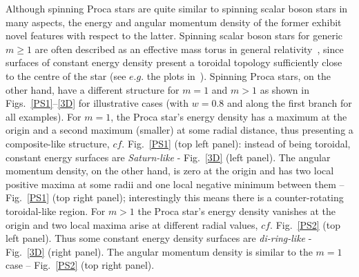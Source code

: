 Although spinning Proca stars are quite similar to spinning scalar boson stars in many aspects, the energy and angular momentum density of the former exhibit novel features with respect to the latter.
Spinning scalar boson stars for generic $m\geqslant 1$ are often described as an effective mass torus in general relativity~\cite{Schunck:1996he}, since surfaces of constant energy density present a toroidal topology sufficiently close to the centre of the star (see $e.g.$ the plots in~\cite{Herdeiro:2014ima}).
Spinning Proca stars, on the other hand, have a different structure for $m=1$ and $m>1$ as shown in Figs.~\ref{PS1}--\ref{3D} for illustrative cases (with $w=0.8$ and along the first branch for all examples).
For $m=1$, the Proca star's energy density has a maximum at the origin and a second maximum (smaller) at some radial distance, thus presenting a composite-like structure, $cf.$ Fig.~\ref{PS1} (top left panel): instead of being toroidal, constant energy surfaces are \textit{Saturn-like} - Fig.~\ref{3D} (left panel).
The angular momentum density, on the other hand, is zero at the origin and has two local positive maxima at some radii and one local negative minimum between them -- Fig.~\ref{PS1} (top right panel); interestingly this means there is a counter-rotating toroidal-like region.
For $m>1$ the Proca star's energy density vanishes at the origin and two local maxima arise at different radial values, $cf.$ Fig.~\ref{PS2} (top left panel).
Thus some constant energy density surfaces are \textit{di-ring-like} - Fig.~\ref{3D} (right panel).
The angular momentum density is similar to the $m=1$ case -- Fig.~\ref{PS2} (top right panel).


